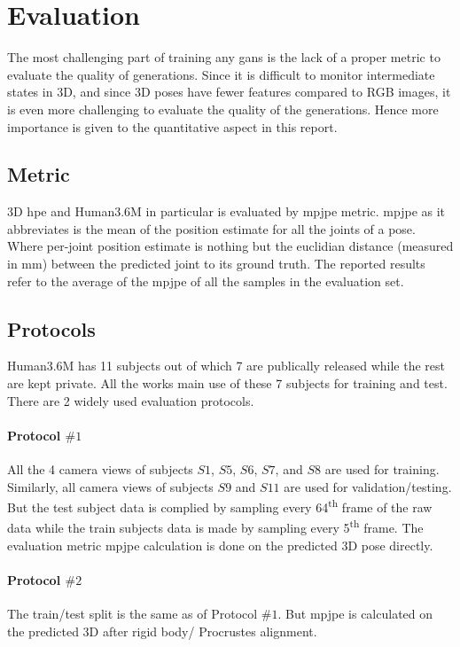 \section{Evaluation} 
The most challenging part of training any \acp{gan} is the lack of a proper metric to evaluate the quality of generations. Since it is difficult to monitor intermediate states in 3D, and since 3D poses have fewer features compared to RGB images, it is even more challenging to evaluate the quality of the generations. Hence more importance is given to the quantitative aspect in this report.

\subsection{Metric}
3D \ac{hpe} and Human3.6M in particular is evaluated by \ac{mpjpe} metric. \ac{mpjpe} as it abbreviates is the mean of the position estimate for all the joints of a pose. Where per-joint position estimate is nothing but the euclidian distance (measured in mm) between the predicted joint to its ground truth. The reported results refer to the average of the \ac{mpjpe} of all the samples in the evaluation set. 

\subsection{Protocols}
Human3.6M has 11 subjects out of which 7 are publically released while the rest are kept private. All the works main use of these 7 subjects for training and test. There are 2 widely used evaluation protocols. 

\paragraph{Protocol $\#1$} All the 4 camera views of subjects $S1$, $S5$, $S6$, $S7$, and $S8$ are used for training. Similarly, all camera views of subjects $S9$ and $S11$ are used for validation/testing. But the test subject data is complied by sampling every 64\textsuperscript{th} frame of the raw data while the train subjects data is made by sampling every 5\textsuperscript{th} frame. 
The evaluation metric \ac{mpjpe} calculation is done on the predicted 3D pose directly.

\paragraph{Protocol $\#2$} The train/test split is the same as of Protocol $\#1$. But \ac{mpjpe} is calculated on the predicted 3D after rigid body/ Procrustes alignment.

